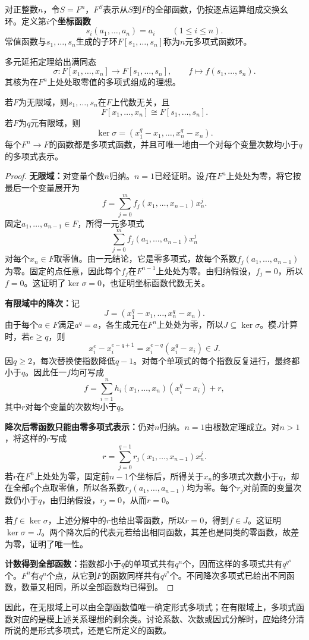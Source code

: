 \begin{definition}
对正整数$n$，令$S=F^n$，$F^S$表示从$S$到$F$的全部函数，仍按逐点运算组成交换幺环。定义第$i$个\textbf{坐标函数}
\[
s_i(a_1,\ldots,a_n)=a_i\qquad(1\le i\le n).
\]
常值函数与$s_1,\ldots,s_n$生成的子环$F[s_1,\ldots,s_n]$称为$n$元多项式函数环。
\end{definition}

多元延拓定理给出满同态
\[
\sigma:F[x_1,\ldots,x_n]\to F[s_1,\ldots,s_n],
\qquad f\longmapsto f(s_1,\ldots,s_n).
\]
其核为在$F^n$上处处取零值的多项式组成的理想。

\begin{theorem}\label{p2:poly-functions-many}
若$F$为无限域，则$s_1,\ldots,s_n$在$F$上代数无关，且
\[
F[x_1,\ldots,x_n]\cong F[s_1,\ldots,s_n].
\]
若$F$为$q$元有限域，则
\[
\ker\sigma=(x_1^q-x_1,\ldots,x_n^q-x_n).
\]
每个$F^n\to F$的函数都是多项式函数，并且可唯一地由一个对每个变量次数均小于$q$的多项式表示。
\end{theorem}
\begin{proof}
\textbf{无限域：}对变量个数$n$归纳。$n=1$已经证明。设$f$在$F^n$上处处为零，将它按最后一个变量展开为
\[
f=\sum_{j=0}^m f_j(x_1,\ldots,x_{n-1})x_n^j.
\]
固定$a_1,\ldots,a_{n-1}\in F$，所得一元多项式
\[
\sum_{j=0}^m f_j(a_1,\ldots,a_{n-1})x_n^j
\]
对每个$x_n\in F$取零值。由一元结论，它是零多项式，故每个系数$f_j(a_1,\ldots,a_{n-1})$为零。固定的点任意，因此每个$f_j$在$F^{n-1}$上处处为零。由归纳假设，$f_j=0$，所以$f=0$。这证明了$\ker\sigma=0$，也证明坐标函数代数无关。

\textbf{有限域中的降次：}记
\[
J=(x_1^q-x_1,\ldots,x_n^q-x_n).
\]
由于每个$a\in F$满足$a^q=a$，各生成元在$F^n$上处处为零，所以$J\subseteq\ker\sigma$。模$J$计算时，若$e\ge q$，则
\[
x_i^e-x_i^{e-q+1}=x_i^{e-q}(x_i^q-x_i)\in J.
\]
因$q\ge2$，每次替换使指数降低$q-1$。对每个单项式的每个指数反复进行，最终都小于$q$。因此任一$f$均可写成
\[
f=\sum_{i=1}^n h_i(x_1,\ldots,x_n)(x_i^q-x_i)+r,
\]
其中$r$对每个变量的次数均小于$q$。

\textbf{降次后零函数只能由零多项式表示：}仍对$n$归纳。$n=1$由根数定理成立。对$n>1$，将这样的$r$写成
\[
r=\sum_{j=0}^{q-1}r_j(x_1,\ldots,x_{n-1})x_n^j.
\]
若$r$在$F^n$上处处为零，固定前$n-1$个坐标后，所得关于$x_n$的多项式次数小于$q$，却在全部$q$个点取零值，所以各系数$r_j(a_1,\ldots,a_{n-1})$均为零。每个$r_j$对前面的变量次数仍小于$q$，由归纳假设，$r_j=0$，从而$r=0$。

若$f\in\ker\sigma$，上述分解中的$r$也给出零函数，所以$r=0$，得到$f\in J$。这证明$\ker\sigma=J$。两个降次后的代表元若给出相同函数，其差也是同类的零函数，故差为零，证明了唯一性。

\textbf{计数得到全部函数：}指数都小于$q$的单项式共有$q^n$个，因而这样的多项式共有$q^{q^n}$个。$F^n$有$q^n$个点，从它到$F$的函数同样共有$q^{q^n}$个。不同降次多项式已给出不同函数，数量又相同，所以全部函数均已得到。
\end{proof}

因此，在无限域上可以由全部函数值唯一确定形式多项式；在有限域上，多项式函数对应的是模上述关系理想的剩余类。讨论系数、次数或因式分解时，应始终分清所说的是形式多项式，还是它所定义的函数。


%
